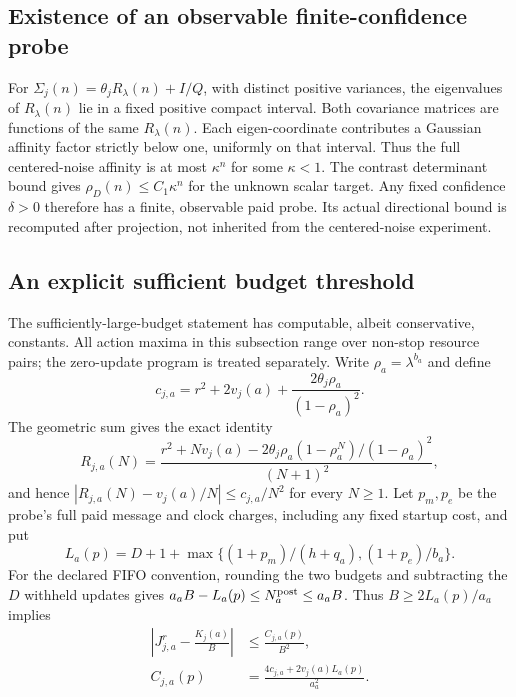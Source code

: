 \subsection{Existence of an observable finite-confidence probe}
For $\Sigma_j(n)=\theta_jR_\lambda(n)+I/Q$, with distinct positive variances,
the eigenvalues of $R_\lambda(n)$ lie in a fixed positive compact interval.
Both covariance matrices are functions of the same $R_\lambda(n)$.
Each eigen-coordinate contributes a Gaussian affinity factor strictly below
one, uniformly on that interval.
Thus the full centered-noise affinity is at most $\kappa^n$ for some
$\kappa<1$.
The contrast determinant bound gives $\rho_D(n)\le C_1\kappa^n$ for the
unknown scalar target.
Any fixed confidence $\delta>0$ therefore has a finite, observable paid probe.
Its actual directional bound is recomputed after projection, not inherited
from the centered-noise experiment.

\subsection{An explicit sufficient budget threshold}
The sufficiently-large-budget statement has computable, albeit conservative, constants.
All action maxima in this subsection range over non-stop resource pairs; the zero-update program is treated separately.
Write $\rho_a=\lambda^{b_a}$ and define
\[
c_{j,a}=r^2+2v_j(a)+\frac{2\theta_j\rho_a}{(1-\rho_a)^2}.
\]
The geometric sum gives the exact identity
\[
R_{j,a}(N)=\frac{r^2+Nv_j(a)-2\theta_j\rho_a(1-\rho_a^N)/(1-\rho_a)^2}{(N+1)^2},
\]
and hence $|R_{j,a}(N)-v_j(a)/N|\le c_{j,a}/N^2$ for every $N\ge1$.
Let $p_m,p_e$ be the probe's full paid message and clock charges, including any fixed startup cost, and put
\[
L_a(p)=D+1+\max\{(1+p_m)/(h+q_a),(1+p_e)/b_a\}.
\]
For the declared FIFO convention, rounding the two budgets and subtracting the $D$ withheld updates gives
$a_aB-L_a(p)\le N_a^{\rm post}\le a_aB$.
Thus $B\ge2L_a(p)/a_a$ implies
\begin{align*}
\left|J_{j,a}^{r}-\frac{K_j(a)}B\right|&\le\frac{C_{j,a}(p)}{B^2},\\
C_{j,a}(p)&=\frac{4c_{j,a}+2v_j(a)L_a(p)}{a_a^2}.
\end{align*}

